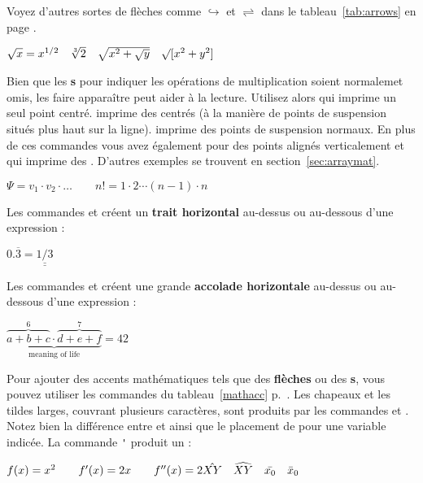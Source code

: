 Voyez d'autres sortes de flèches comme $\hookrightarrow$ et
$\rightleftharpoons$ dans le tableau~\ref{tab:arrows} en page
\pageref{tab:arrows}.
\begin{example}
$\sqrt{x} = x^{1/2}
 \quad \sqrt[3]{2}
 \quad \sqrt{x^{2} + \sqrt{y}}
 \quad \surd[x^2 + y^2]$
\end{example}


Bien que les \textbf{s} pour indiquer les opérations de
multiplication soient normalemet omis, les faire apparaître peut aider à
la lecture. Utilisez
alors  qui imprime un seul point centré.  imprime
des \textbf{} centrés (à la manière de points
de suspension situés plus haut sur la ligne).  imprime des
points de suspension normaux. En plus de ces commandes vous avez
également  pour des points alignés verticalement et
 qui imprime des . D'autres exemples
se trouvent en section~\ref{sec:arraymat}.
\begin{example}
$\Psi = v_1 \cdot v_2
 \cdot \ldots \qquad
 n! = 1 \cdot 2
 \cdots (n-1) \cdot n$
\end{example}

Les commandes  et  créent un \textbf{trait
horizontal} au-dessus ou au-dessous d'une expression :
\begin{example}
$0.\overline{3} =
 \underline{\underline{1/3}}$
\end{example}

Les commandes  et  créent une grande
\textbf{accolade horizontale} au-dessus ou au-dessous d'une
expression :
\begin{example}
$\underbrace{\overbrace{a+b+c}^6
 \cdot \overbrace{d+e+f}^7}
 _{\text{meaning of life}} = 42$
\end{example}

Pour ajouter des accents mathématiques tels que des \textbf{flèches}
ou des \textbf{s}, vous pouvez utiliser les commandes du
tableau~\ref{mathacc} p.~\pageref{mathacc}.  Les chapeaux et les
tildes larges, couvrant plusieurs caractères, sont produits par les
commandes  et . Notez bien la différence
entre  et  ainsi que le placement de  pour
une variable indicée. La commande \verb|'| produit
un  :
\begin{example}
$f(x) = x^2 \qquad f'(x)
 = 2x \qquad f''(x) = 2\\[5pt]
 \hat{XY} \quad \widehat{XY}
 \quad \bar{x_0} \quad \bar{x}_0$
\end{example}


